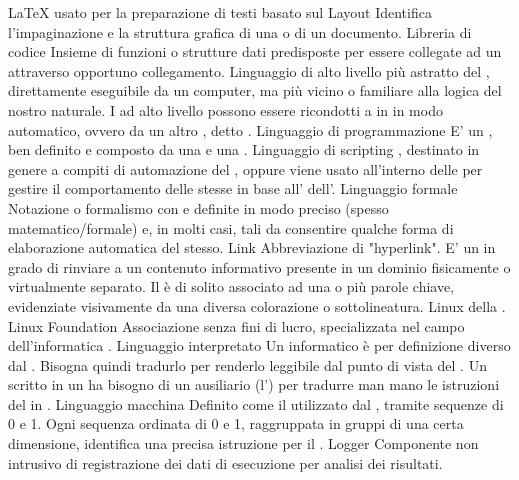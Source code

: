 \elemento
{LaTeX} 
{ usato per la preparazione di testi basato sul  }
\elemento
{Layout} 
{Identifica l'impaginazione e la struttura grafica di una  o di un documento.}
\elemento
{Libreria di codice} 
{Insieme di funzioni o strutture dati predisposte per essere collegate ad un   attraverso opportuno collegamento.}
\elemento
{Linguaggio di alto livello} 
{ più astratto del , direttamente eseguibile da un computer, ma più vicino o familiare alla logica del nostro  naturale. I  ad alto livello possono essere ricondotti a  in  in modo automatico, ovvero da un altro , detto .}
\elemento
{Linguaggio di programmazione} 
{E' un , ben definito e composto da una  e una .}
\elemento
{Linguaggio di scripting} 
{, destinato in genere a compiti di automazione del , oppure viene usato all'interno delle  per gestire il comportamento delle  stesse in base all'  dell'.}
\elemento
{Linguaggio formale} 
{Notazione o formalismo con  e  definite in modo preciso (spesso matematico/formale) e, in molti casi, tali da consentire qualche forma di elaborazione automatica del  stesso.}
\elemento
{Link} 
{Abbreviazione di "hyperlink". E' un  in grado di rinviare a un contenuto informativo presente in un dominio fisicamente o virtualmente separato. Il  è di solito associato ad una o più parole chiave, evidenziate visivamente da una diversa colorazione o sottolineatura.}
\elemento
{Linux} 
{ della .}
\elemento
{Linux Foundation} 
{Associazione senza fini di lucro, specializzata nel campo dell'informatica .}
\elemento
{Linguaggio interpretato} 
{Un  informatico è per definizione diverso dal . Bisogna quindi tradurlo per renderlo leggibile dal punto di vista del . Un  scritto in un  ha bisogno di un  ausiliario (l') per tradurre man mano le istruzioni del  in .}
\elemento
{Linguaggio macchina} 
{Definito come il  utilizzato dal , tramite sequenze di 0 e 1. Ogni sequenza ordinata di 0 e 1, raggruppata in gruppi di una certa dimensione, identifica una precisa istruzione per il .}
\elemento
{Logger}
{Componente non intrusivo di registrazione dei dati di esecuzione per analisi dei risultati.}

